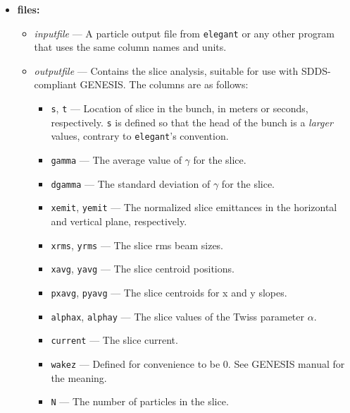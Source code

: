 \begin{itemize}
\item {\bf files:}
\begin{itemize}
\item {\em inputfile} --- A particle output file from \verb|elegant| or any other program that
uses the same column names and units.  
\item {\em outputfile} --- Contains the slice analysis, suitable for use with SDDS-compliant GENESIS.  The columns are
as follows:
\begin{itemize}
\item \verb|s|, \verb|t| --- Location of slice in the bunch, in meters or seconds, respectively. \verb|s| is defined
  so that the head of the bunch is a {\em larger} values, contrary to {\tt elegant}'s convention.
\item \verb|gamma| --- The average value of $\gamma$ for the slice.
\item \verb|dgamma| --- The standard deviation of $\gamma$ for the slice.
\item \verb|xemit|, \verb|yemit| --- The normalized slice emittances in the horizontal and vertical plane, respectively.
\item \verb|xrms|, \verb|yrms| --- The slice rms beam sizes.
\item \verb|xavg|, \verb|yavg| --- The slice centroid positions.
\item \verb|pxavg|, \verb|pyavg| --- The slice centroids for x and y slopes.
\item \verb|alphax|, \verb|alphay| --- The slice values of the Twiss parameter $\alpha$.
\item \verb|current| --- The slice current.
\item \verb|wakez| --- Defined for convenience to be 0.  See GENESIS manual for the meaning.
\item \verb|N| --- The number of particles in the slice.
\end{itemize}
\end{itemize}


\end{itemize}
